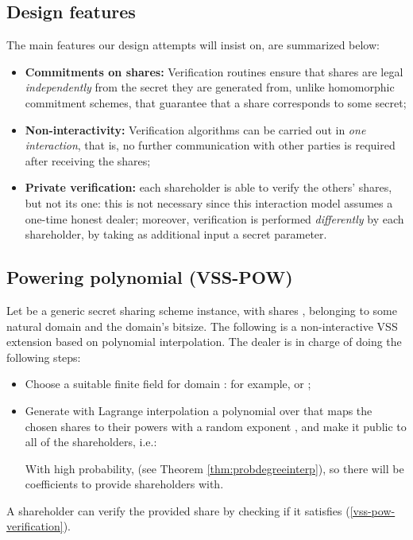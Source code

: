 \documentclass[10pt,journal,cspaper,compsoc]{IEEEtran}
\begin{document}
\subsection{Design features}
The main features our design attempts will insist on, are summarized below:
\begin{itemize}
\item \textbf{Commitments on shares:} Verification routines ensure that shares are legal \emph{independently} from the secret they are generated from, unlike homomorphic commitment schemes, that guarantee that a share corresponds to some secret;
\item \textbf{Non-interactivity:} Verification algorithms can be carried out in \emph{one interaction}, that is, no further communication with other parties is required after receiving the shares;
\item \textbf{Private verification:} each shareholder is able to verify the others' shares, but not its one: this is not necessary since this interaction model assumes a one-time honest dealer; moreover, verification is performed \emph{differently} by each shareholder, by taking as additional input a secret parameter.
\end{itemize}


\subsection{Powering polynomial (VSS-POW)}
Let  be a generic secret sharing scheme instance, with shares ,  belonging to some natural domain  and  the domain's bitsize. The following is a non-interactive VSS extension based on polynomial interpolation. The dealer is in charge of doing the following steps:

\begin{itemize}
\item Choose a suitable finite field  for domain : for example,  or ;
\item Generate with Lagrange interpolation a polynomial  over  that maps the chosen shares to their powers with a random exponent , and make it public to all of the shareholders, i.e.:



With high probability,  (see Theorem \ref{thm:probdegreeinterp}), so there will be  coefficients to provide shareholders with.
\end{itemize}

A shareholder can verify the provided share by checking if it satisfies (\ref{vss-pow-verification}).
\end{document}
